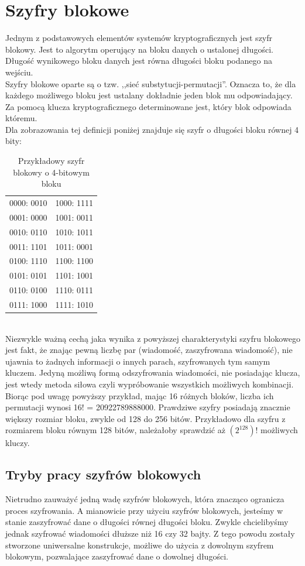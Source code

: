 \section{Szyfry blokowe}
Jednym z podstawowych elementów systemów kryptograficznych jest szyfr blokowy. Jest to algorytm operujący na bloku danych o ustalonej długości. Długość wynikowego bloku danych jest równa długości bloku podanego na wejściu. \\
Szyfry blokowe oparte są o tzw. ,,sieć substytucji-permutacji''. 
Oznacza to, że dla każdego możliwego bloku jest ustalany dokładnie jeden blok mu odpowiadający. Za pomocą klucza kryptograficznego determinowane jest, który blok odpowiada któremu. \\
Dla zobrazowania tej definicji poniżej znajduje się szyfr o długości bloku równej 4 bity:
\begin{table}[h!]
\centering
\caption{Przykładowy szyfr blokowy o 4-bitowym bloku}
\begin{tabular}{ |c|c| } 
 \hline
	0000: 0010 & 1000: 1111 \\
	0001: 0000 & 1001: 0011 \\
	0010: 0110 & 1010: 1011 \\
	0011: 1101 & 1011: 0001 \\
	0100: 1110 & 1100: 1100 \\
	0101: 0101 & 1101: 1001 \\
	0110: 0100 & 1110: 0111 \\
	0111: 1000 & 1111: 1010 \\
 \hline
\end{tabular}
\end{table} \\
Niezwykle ważną cechą jaka wynika z powyższej charakterystyki szyfru blokowego jest fakt, że znając pewną liczbę par (wiadomość, zaszyfrowana wiadomość), nie ujawnia to żadnych informacji o innych parach, szyfrowanych tym samym kluczem.
Jedyną możliwą formą odszyfrowania wiadomości, nie posiadając klucza, jest wtedy metoda siłowa czyli wypróbowanie wszystkich możliwych kombinacji. 
Biorąc pod uwagę powyższy przykład, mając 16 różnych bloków, liczba ich permutacji wynosi 16! = 20922789888000. 
Prawdziwe szyfry posiadają znacznie większy rozmiar bloku, zwykle od 128 do 256 bitów. Przykładowo dla szyfru z rozmiarem bloku równym 128 bitów, należałoby sprawdzić aż $(2^{128})!$ możliwych kluczy.

\subsection{Tryby pracy szyfrów blokowych}
Nietrudno zauważyć jedną wadę szyfrów blokowych, która znacząco ogranicza proces szyfrowania. 
A mianowicie przy użyciu szyfrów blokowych, jesteśmy w stanie zaszyfrować dane o długości równej długości bloku. 
Zwykle chcielibyśmy jednak szyfrować wiadomości dłuższe niż 16 czy 32 bajty. 
Z tego powodu zostały stworzone uniwersalne konstrukcje, możliwe do użycia z dowolnym szyfrem blokowym, 
pozwalające zaszyfrować dane o dowolnej długości.

